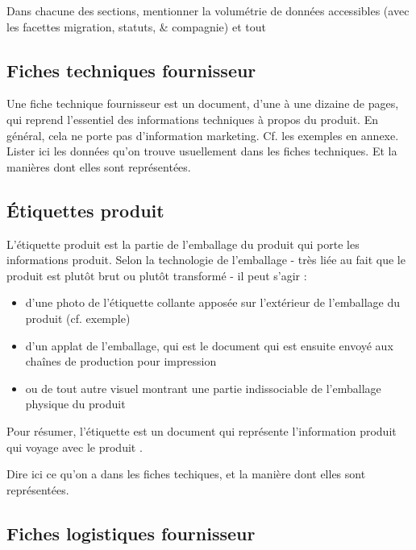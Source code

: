             Dans chacune des sections, mentionner la volumétrie de données accessibles (avec les facettes migration, statuts, \& compagnie) et tout

            \subsection{Fiches techniques fournisseur}

            \label{fiches_techniques}
            Une fiche technique fournisseur est un document, d'une à une dizaine de pages, qui reprend l'essentiel des informations techniques à propos du produit.
            En général, cela ne porte pas d'information marketing.
            Cf. les exemples en annexe.
            Lister ici les données qu'on trouve usuellement dans les fiches techniques.
            Et la manières dont elles sont représentées.

            \subsection{\'{E}tiquettes produit}
            
            \label{etiquettes_produit}
            L'étiquette produit est la partie de l'emballage du produit qui porte les informations produit.
            Selon la technologie de l'emballage - très liée au fait que le produit est plutôt brut ou plutôt transformé - il peut s'agir :
            \begin{itemize}
                \item d'une photo de l'étiquette collante apposée sur l'extérieur de l'emballage du produit (cf. exemple)
                \item d'un applat de l'emballage, qui est le document qui est ensuite envoyé aux chaînes de production pour impression
                \item ou de tout autre visuel montrant une partie indissociable de l'emballage physique du produit
            \end{itemize}
            Pour résumer, l'étiquette est un document qui représente l'information produit qui \og voyage avec le produit \fg.

            Dire ici ce qu'on a dans les fiches techiques, et la manière dont elles sont représentées.

            \subsection{Fiches logistiques fournisseur}
            
